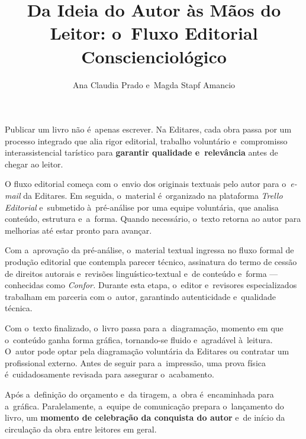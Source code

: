 \documentclass{gescons}
\author{Ana Claudia Prado e~Magda Stapf Amancio}
\title{Da Ideia do Autor às Mãos do Leitor: o~Fluxo Editorial Conscienciológico}
\begin{document}
    \makeentrevistatitle


    


Publicar um livro não é~apenas escrever. Na Editares, cada obra passa por um processo integrado que alia rigor editorial, trabalho voluntário e~compromisso interassistencial tarístico para \textbf{garantir qualidade e~relevância} antes de chegar ao leitor.

O fluxo editorial começa com o~envio dos originais textuais pelo autor para o~\emph{e-mail} da Editares. Em seguida, o~material é~organizado na plataforma \emph{Trello Editorial} e~submetido à~pré-análise por uma equipe voluntária, que analisa conteúdo, estrutura e~a~forma. Quando necessário, o~texto retorna ao autor para melhorias até estar pronto para avançar.

Com a~aprovação da pré-análise, o~material textual ingressa no fluxo formal de produção editorial que contempla parecer técnico, assinatura do termo de cessão de direitos autorais e~revisões linguístico-textual e~de conteúdo e~forma --- conhecidas como \emph{Confor.} Durante esta etapa, o~editor e~revisores especializados trabalham em parceria com o~autor, garantindo autenticidade e~qualidade técnica.

Com o~texto finalizado, o~livro passa para a~diagramação, momento em que o~conteúdo ganha forma gráfica, tornando-se fluido e~agradável à~leitura. O~autor pode optar pela diagramação voluntária da Editares ou contratar um profissional externo. Antes de seguir para a~impressão, uma prova física é~cuidadosamente revisada para assegurar o~acabamento.

Após a~definição do orçamento e~da tiragem, a~obra é~encaminhada para a~gráfica. Paralelamente, a~equipe de comunicação prepara o~lançamento do livro, um \textbf{momento de celebração da conquista do autor} e~de início da circulação da obra entre leitores em geral.
\end{document}
